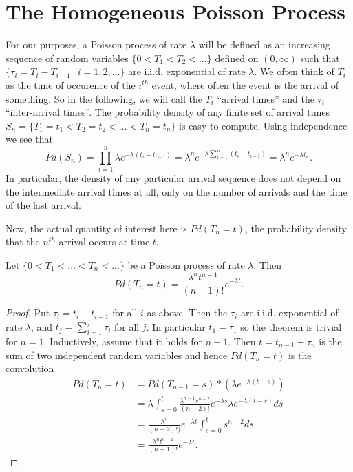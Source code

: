 \documentclass[12pt,leqno]{article}
\begin{document}
\section{The Homogeneous Poisson Process}
For our purposes, a Poisson process of rate $\lambda$ will be defined as an increasing sequence of random variables
$ \{0 < T_1 < T_2 < \dots\}$ defined on $(0,\infty)$ such that $\{\tau_i = T_i-T_{i-1}~|~ i = 1,2,\dots\}$ are i.i.d.
exponential of rate $\lambda$. We often think of $T_i$ as the time of occurence of the $i^{th}$
event, where often the event is the arrival of something.  So in the following, we will call the $T_i$
``arrival times'' and the $\tau_i$ ``inter-arrival times''.  The probability density of any finite set of arrival times
$S_n = \{T_1 = t_1 < T_2 = t_2<\dots<T_n = t_n\}$ is easy to compute. Using independence we see that
\begin{equation}\label{arr_seq}
Pd(S_n) = \prod_{i=1}^n\lambda{e}^{-\lambda(t_i - t_{i-1})} = \lambda^ne^{-\lambda\sum_{i = 1}^n(t_i-t_{i-1})} = \lambda^ne^{-\lambda{t_n}}.
\end{equation}
In particular, the density of any particular arrival sequence does not depend on the intermediate arrival times
at all, only on the number of arrivals and the time of the last arrival.

Now, the actual quantity of interest here
is $Pd(T_n = t)$, the probability density that the $n^{th}$ arrival occurs at time $t$.
\begin{Thm}
  Let $\{0 < T_1<\dots<T_n<... \}$ be a Poisson process of rate $\lambda$.  Then
  \begin{equation}\label{erlang}
  Pd(T_n = t) = \frac{\lambda^nt^{n-1}}{(n-1)!}e^{-\lambda{t}}.
  \end{equation}
  \begin{proof}
    Put $\tau_i = t_i - t_{i-1}$ for all $i$ as above. Then the $\tau_i$ are i.i.d. exponential of rate $\lambda$, and
    $t_j = \sum_{i=1}^j \tau_i$ for all $j$.  In particular $t_1 = \tau_1$ so the theorem is trivial for $n = 1$.
    Inductively, assume that it holds for $n-1$. Then $t = t_{n-1} + \tau_n$ is the sum of two independent random
    variables and hence $Pd(T_n = t)$ is the convolution
    \begin{align*}
      Pd(T_n = t) &= Pd(T_{n-1} = s)*({\lambda}e^{-\lambda(t-s)})\\
      &= \lambda\int_{s=0}^t\frac{\lambda^{n-1}s^{n-2}}{(n-2)!}e^{-\lambda{s}}{\lambda}e^{-\lambda(t-s)}ds \\
      &= \frac{\lambda^n}{(n-2)!)}e^{-\lambda{t}}\int_{s=0}^ts^{n-2}ds \\
      &= \frac{\lambda^nt^{n-1}}{(n-1)!}e^{-\lambda{t}}.
    \end{align*}
  \end{proof}
\end{Thm}
\end{document}
